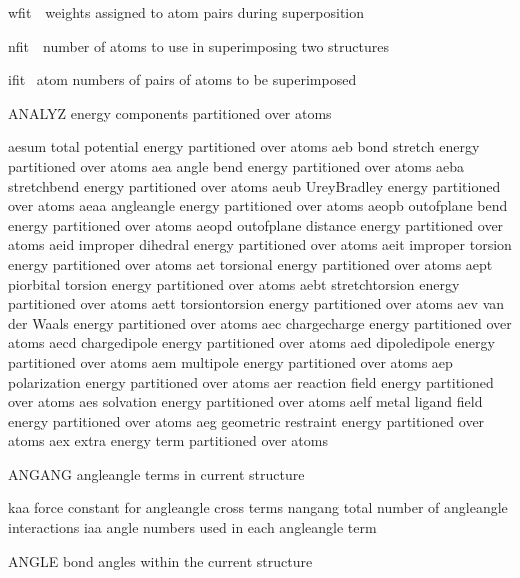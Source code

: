 \documentclass[letterpaper,11pt,english]{sphinxmanual}
\begin{document}
\begin{DUlineblock}{0em}
\item[] 
\item[] wfit  weights assigned to atom pairs during superposition
\item[] nfit  number of atoms to use in superimposing two structures
\item[] ifit  atom numbers of pairs of atoms to be superimposed
\end{DUlineblock}

ANALYZ  energy components partitioned over atoms

aesum   total potential energy partitioned over atoms
aeb     bond stretch energy partitioned over atoms
aea     angle bend energy partitioned over atoms
aeba    stretch\sphinxhyphen{}bend energy partitioned over atoms
aeub    Urey\sphinxhyphen{}Bradley energy partitioned over atoms
aeaa    angle\sphinxhyphen{}angle energy partitioned over atoms
aeopb   out\sphinxhyphen{}of\sphinxhyphen{}plane bend energy partitioned over atoms
aeopd   out\sphinxhyphen{}of\sphinxhyphen{}plane distance energy partitioned over atoms
aeid    improper dihedral energy partitioned over atoms
aeit    improper torsion energy partitioned over atoms
aet     torsional energy partitioned over atoms
aept    pi\sphinxhyphen{}orbital torsion energy partitioned over atoms
aebt    stretch\sphinxhyphen{}torsion energy partitioned over atoms
aett    torsion\sphinxhyphen{}torsion energy partitioned over atoms
aev     van der Waals energy partitioned over atoms
aec     charge\sphinxhyphen{}charge energy partitioned over atoms
aecd    charge\sphinxhyphen{}dipole energy partitioned over atoms
aed     dipole\sphinxhyphen{}dipole energy partitioned over atoms
aem     multipole energy partitioned over atoms
aep     polarization energy partitioned over atoms
aer     reaction field energy partitioned over atoms
aes     solvation energy partitioned over atoms
aelf    metal ligand field energy partitioned over atoms
aeg     geometric restraint energy partitioned over atoms
aex     extra energy term partitioned over atoms

ANGANG  angle\sphinxhyphen{}angle terms in current structure

kaa     force constant for angle\sphinxhyphen{}angle cross terms
nangang total number of angle\sphinxhyphen{}angle interactions
iaa     angle numbers used in each angle\sphinxhyphen{}angle term

ANGLE   bond angles within the current structure
\end{document}
